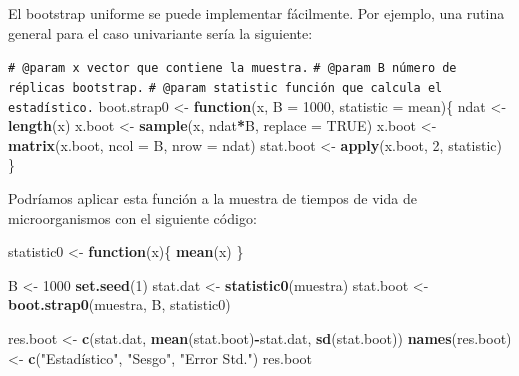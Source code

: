 \documentclass[
]{book}
\newenvironment{Shaded}{\begin{snugshade}}{\end{snugshade}}
\newcommand{\AttributeTok}[1]{\textcolor[rgb]{0.13,0.29,0.53}{#1}}
\newcommand{\CommentTok}[1]{\textcolor[rgb]{0.56,0.35,0.01}{\textit{#1}}}
\newcommand{\ConstantTok}[1]{\textcolor[rgb]{0.56,0.35,0.01}{#1}}
\newcommand{\ControlFlowTok}[1]{\textcolor[rgb]{0.13,0.29,0.53}{\textbf{#1}}}
\newcommand{\DecValTok}[1]{\textcolor[rgb]{0.00,0.00,0.81}{#1}}
\newcommand{\FunctionTok}[1]{\textcolor[rgb]{0.13,0.29,0.53}{\textbf{#1}}}
\newcommand{\NormalTok}[1]{#1}
\newcommand{\OtherTok}[1]{\textcolor[rgb]{0.56,0.35,0.01}{#1}}
\newcommand{\SpecialCharTok}[1]{\textcolor[rgb]{0.81,0.36,0.00}{\textbf{#1}}}
\newcommand{\StringTok}[1]{\textcolor[rgb]{0.31,0.60,0.02}{#1}}
\theoremstyle{break}
\theoremstyle{nonumberplain}
\renewcommand{\CommentTok}[1]{\textcolor[rgb]{0.41,0.41,0.41}{\texttt{#1}}}
\begin{document}
El bootstrap uniforme se puede implementar fácilmente.
Por ejemplo, una rutina general para el caso univariante sería la siguiente:

\begin{Shaded}
\begin{Highlighting}[]
\CommentTok{\#\textquotesingle{} @param x vector que contiene la muestra.}
\CommentTok{\#\textquotesingle{} @param B número de réplicas bootstrap.}
\CommentTok{\#\textquotesingle{} @param statistic función que calcula el estadístico.}
\NormalTok{boot.strap0 }\OtherTok{\textless{}{-}} \ControlFlowTok{function}\NormalTok{(x, }\AttributeTok{B =} \DecValTok{1000}\NormalTok{, }\AttributeTok{statistic =}\NormalTok{ mean)\{}
\NormalTok{  ndat }\OtherTok{\textless{}{-}} \FunctionTok{length}\NormalTok{(x)}
\NormalTok{  x.boot }\OtherTok{\textless{}{-}} \FunctionTok{sample}\NormalTok{(x, ndat}\SpecialCharTok{*}\NormalTok{B, }\AttributeTok{replace =} \ConstantTok{TRUE}\NormalTok{)}
\NormalTok{  x.boot }\OtherTok{\textless{}{-}} \FunctionTok{matrix}\NormalTok{(x.boot, }\AttributeTok{ncol =}\NormalTok{ B, }\AttributeTok{nrow =}\NormalTok{ ndat)}
\NormalTok{  stat.boot }\OtherTok{\textless{}{-}} \FunctionTok{apply}\NormalTok{(x.boot, }\DecValTok{2}\NormalTok{, statistic)}
\NormalTok{\}}
\end{Highlighting}
\end{Shaded}

Podríamos aplicar esta función a la muestra de tiempos de vida de microorganismos con el siguiente código:

\begin{Shaded}
\begin{Highlighting}[]
\NormalTok{statistic0 }\OtherTok{\textless{}{-}} \ControlFlowTok{function}\NormalTok{(x)\{}
  \FunctionTok{mean}\NormalTok{(x)}
\NormalTok{\}}

\NormalTok{B }\OtherTok{\textless{}{-}} \DecValTok{1000}
\FunctionTok{set.seed}\NormalTok{(}\DecValTok{1}\NormalTok{)}
\NormalTok{stat.dat }\OtherTok{\textless{}{-}} \FunctionTok{statistic0}\NormalTok{(muestra)}
\NormalTok{stat.boot }\OtherTok{\textless{}{-}} \FunctionTok{boot.strap0}\NormalTok{(muestra, B, statistic0)}

\NormalTok{res.boot }\OtherTok{\textless{}{-}} \FunctionTok{c}\NormalTok{(stat.dat, }\FunctionTok{mean}\NormalTok{(stat.boot)}\SpecialCharTok{{-}}\NormalTok{stat.dat, }\FunctionTok{sd}\NormalTok{(stat.boot))}
\FunctionTok{names}\NormalTok{(res.boot) }\OtherTok{\textless{}{-}} \FunctionTok{c}\NormalTok{(}\StringTok{"Estadístico"}\NormalTok{, }\StringTok{"Sesgo"}\NormalTok{, }\StringTok{"Error Std."}\NormalTok{)}
\NormalTok{res.boot}
\end{Highlighting}
\end{Shaded}
\end{document}
